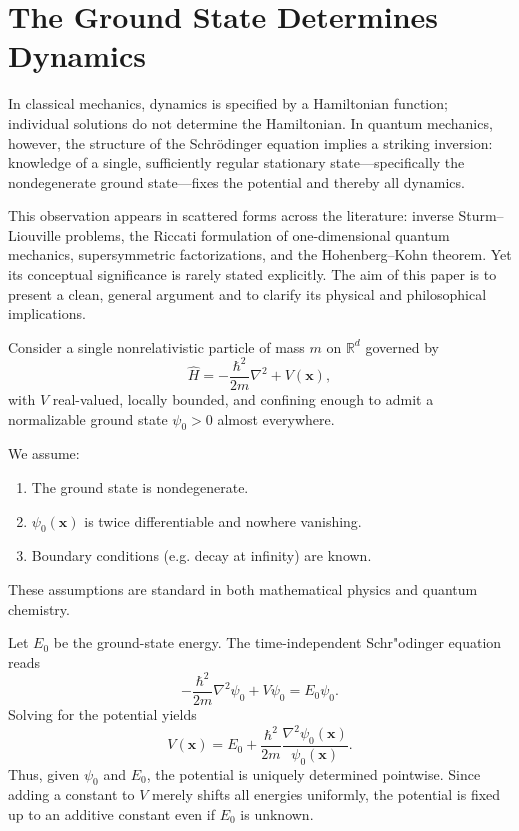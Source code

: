 \chapter{The Ground State Determines  Dynamics }
\label{gsdd}

In classical mechanics, dynamics is specified by a Hamiltonian function; individual solutions do not determine the Hamiltonian. In quantum mechanics, however, the structure of the Schr\"odinger equation implies a striking inversion: knowledge of a single, sufficiently regular stationary state---specifically the nondegenerate ground state---fixes the potential and thereby all dynamics.

This observation appears in scattered forms across the literature: inverse Sturm--Liouville problems, the Riccati formulation of one-dimensional quantum mechanics, supersymmetric factorizations, and the Hohenberg--Kohn theorem. Yet its conceptual significance is rarely stated explicitly. The aim of this paper is to present a clean, general argument and to clarify its physical and philosophical implications.

Consider a single nonrelativistic particle of mass $m$ on $\mathbb{R}^d$ governed by
\begin{equation}
\hat H = -\frac{\hbar^2}{2m}\nabla^2 + V(\mathbf{x}),
\end{equation}
with $V$ real-valued, locally bounded, and confining enough to admit a normalizable ground state $\psi_0>0$ almost everywhere.

We assume:
\begin{enumerate}
\item The ground state is nondegenerate.
\item $\psi_0(\mathbf{x})$ is twice differentiable and nowhere vanishing.
\item Boundary conditions (e.g. decay at infinity) are known.
\end{enumerate}
These assumptions are standard in both mathematical physics and quantum chemistry.

Let $E_0$ be the ground-state energy. The time-independent Schr"odinger equation reads
\begin{equation}
-\frac{\hbar^2}{2m}\nabla^2\psi_0 + V\psi_0 = E_0\psi_0.
\end{equation}
Solving for the potential yields
\begin{equation}
    \label{pot1d}
V(\mathbf{x}) = E_0 + \frac{\hbar^2}{2m}\frac{\nabla^2\psi_0(\mathbf{x})}{\psi_0(\mathbf{x})}.
\end{equation}
Thus, given $\psi_0$ and $E_0$, the potential is uniquely determined pointwise. Since adding a constant to $V$ merely shifts all energies uniformly, the potential is fixed up to an additive constant even if $E_0$ is unknown.

